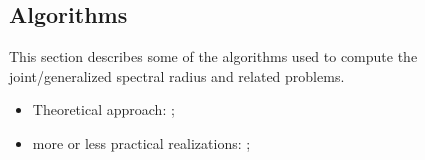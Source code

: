 \documentclass[a4paper,fleqn]{article}
\let\cite=\citep
\begin{document}
\subsection*{Algorithms}
This section describes some of the algorithms used to compute the
joint/generalized spectral radius and related problems.
\begin{itemize}
  \item Theoretical approach: \cite{AJPR:HCSS11, AJPR:SIAMJCO14, BN03,
      BN:SIAMJMA05, BNT:LNSC04, BNT:LAA05, GS:CDC17, GS:MCRF20, GugProt:MC23,
      JP:CDC10, JunProt:SIAMJSC11, Maesumi:LNPAM00, Maesumi:CDC05,
      Maesumi:LAA08, Maesumi:AT98, Moeller15, NesPro:SIAMJMAA13, OPJ:SCL16,
      ParJdb:LNCS07, ParJdb:LAA08, Prot:CDC05:1, ProtCvet:MP20,
      ProtJun:ECC13, Prot:SIAMJCO22};
  \item more or less practical realizations: \cite{CB:IFACWC11, CB:NA13,
      Grip:LAA96, GugProt:FCM13, GugMai:SIMAX26, GugZen:CDC05, GugZen:LAA08,
      JGC:SIAMJMAA14, Koz:DAN09:e, Koz:ArXiv10:1, Koz:DCDSB10, Koz:JDEA11,
      Koz:ArXiv25, Li:IEEETAC11, Mejstrik:ACMTMS20, Mejstrik:19,
      Mejstrik:DRNA22, MejReif:LAA26, Prot:MP15, Vagnoni08, JSRToolbox,
      JSRpack, VHJ:ACM14, WangMM:ACC21, ZhangXu:ArXiv20};
\end{itemize}
\end{document}
